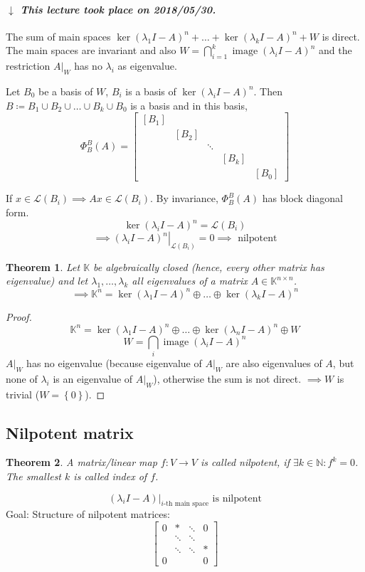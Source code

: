 \documentclass{article}
\newtheorem{theorem}{Theorem}  \numberwithin{theorem}{section}
\newcommand{\set}[1]{\left\{#1\right\}}
\newcommand{\dateref}[1]{%
  \begin{mdframed}[backgroundcolor=gray!10,innerbottommargin=0pt,innertopmargin=0pt]
    \paragraph{\textit{$\downarrow$ This lecture took place on #1.}}%
  \end{mdframed}%
}
\DeclareMathOperator{\im}{image}
\begin{document}
\dateref{2018/05/30}

The sum of main spaces $\ker(\lambda_1 I - A)^n + \dots + \ker(\lambda_k I - A)^n + W$ is direct.
The main spaces are invariant and also $W = \bigcap_{i=1}^k \im(\lambda_i I - A)^n$ and the
restriction $A|_W$ has no $\lambda_i$ as eigenvalue.

Let $B_0$ be a basis of $W$, $B_i$ is a basis of $\ker(\lambda_i I - A)^n$.
Then $B \coloneqq B_1 \cup B_2 \cup \dots \cup B_k \cup B_0$ is a basis and in this basis,
\[
  \Phi_B^B(A) = \begin{bmatrix}
    [B_1] &       &        &       &       \\
          & [B_2] &        &       &       \\
          &       & \ddots &       &       \\
          &       &        & [B_k] &       \\
          &       &        &       & [B_0]
  \end{bmatrix}
\]

If $x \in \mathcal L(B_i) \implies Ax \in \mathcal L(B_i)$.
By invariance, $\Phi_B^B(A)$ has block diagonal form.
\[ \ker(\lambda_i I - A)^n = \mathcal L(B_i) \]
\[ \implies \left. (\lambda_i I - A)^n \right|_{\mathcal L(B_i)} = 0 \implies \text{ nilpotent} \]

\begin{theorem} %
  \label{thm:1115}
  Let $\mathbb K$ be algebraically closed (hence, every other matrix has eigenvalue)
  and let $\lambda_1, \dots, \lambda_k$ all eigenvalues of a matrix $A \in \mathbb K^{n\times n}$.
  \[ \implies \mathbb K^{n} = \ker(\lambda_1 I - A)^n \oplus \dots \oplus \ker(\lambda_k I - A)^n \]
\end{theorem}

\begin{proof}
  \[ \mathbb K^n = \ker(\lambda_1 I - A)^n \oplus \dots \oplus \ker(\lambda_n I - A)^n \oplus W \]
  \[ W = \bigcap_i \im(\lambda_i I - A)^n \]
  $A|_W$ has no eigenvalue (because eigenvalue of $A|_W$ are also eigenvalues of $A$, but none of $\lambda_i$ is an eigenvalue of $A|_W$), otherwise the sum is not direct.
  $\implies W$ is trivial ($W = \set{0}$).
\end{proof}

\subsection{Nilpotent matrix}

\begin{theorem}
  A matrix/linear map $f: V \to V$ is called \emph{nilpotent}, if $\exists k \in \mathbb N: f^k = 0$.
  The smallest $k$ is called \emph{index} of $f$.
\end{theorem}
\[ (\lambda_i I - A)|_{i\text{-th main space}} \text{ is nilpotent} \]
Goal: Structure of nilpotent matrices:
\[
  \begin{bmatrix}
    0 & * & \ddots & 0 \\
      & \ddots & \ddots & \\
      & \ddots & \ddots & * \\
    0 &  & & 0
  \end{bmatrix}
\]
\end{document}
